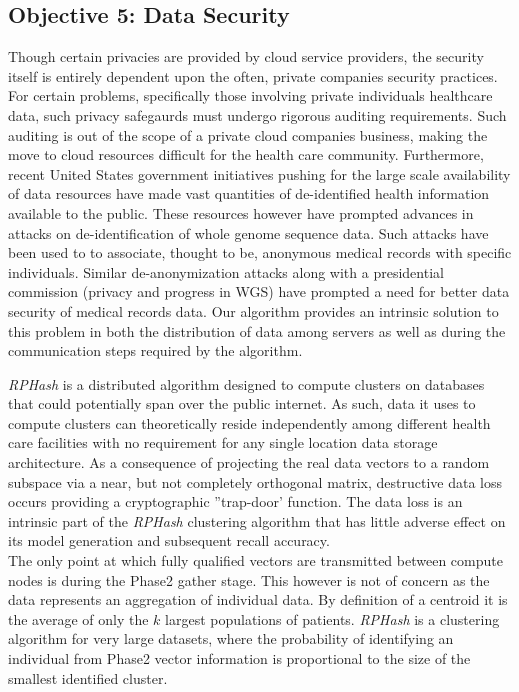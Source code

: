 \documentclass[a4paper,10pt]{article}
\begin{document}
\subsection{Objective 5: Data Security}
Though certain privacies are provided
by cloud service providers, the security itself is entirely dependent upon the often, private
companies security practices. For certain problems, specifically those involving private individuals 
healthcare data, such privacy safegaurds must undergo rigorous auditing requirements. Such 
auditing is out of the scope of a private cloud companies business, making the move to cloud
resources difficult for the health care community.
Furthermore, recent United States government initiatives pushing for the large scale
availability
of data resources have made vast quantities of de-identified health information
available
to the public. These resources however have prompted advances in attacks on de-identification of 
whole genome sequence data. Such attacks have been used to
to associate, thought to be, anonymous medical records with specific individuals\cite{deident}.
Similar de-anonymization 
attacks \cite{deanon1}\cite{deanon2} along with a presidential commission
(privacy and progress in WGS)
have prompted a need for better data security of medical records data. Our
algorithm provides an
intrinsic solution to this problem in both the distribution of data among
servers as well as during the communication steps required by the algorithm.

\emph{RPHash} is a distributed algorithm designed to compute clusters on 
databases that could potentially span over the public internet.
 As such, data it uses to
compute clusters can theoretically reside independently among different health
care facilities with no requirement
for any single location data storage architecture. 
As a consequence of projecting the real data vectors to a random subspace via a
near, but not completely orthogonal
matrix, destructive data loss occurs providing a cryptographic ''trap-door'
function. The data loss is an intrinsic
part of the \emph{RPHash} clustering algorithm that has little adverse effect on its
model generation and subsequent recall accuracy.  
\\
The only point at which fully qualified vectors are transmitted between compute
nodes is during the Phase2 gather stage. This however is not of concern as
the data represents an aggregation of individual data. By definition of a centroid it is the
average of only the $k$ largest populations of patients.
\emph{RPHash} is a clustering algorithm for very large datasets, where the
probability of identifying an individual from Phase2 vector
 information is proportional to the size of the smallest identified cluster.
\end{document}
